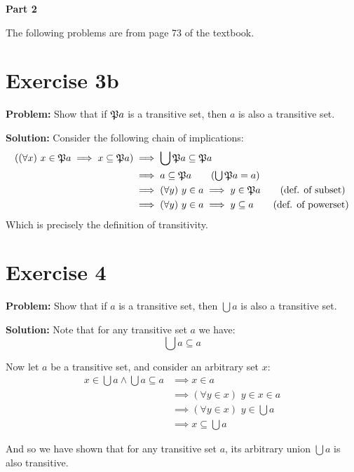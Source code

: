 \documentclass{article}
\begin{document}
\begin{center}
    \Large{\textbf{Part 2}}
\end{center}

The following problems are from page 73 of the textbook.

\section*{Exercise 3b}
\noindent\textbf{Problem:} Show that if $\mathfrak Pa$ is a transitive set, then $a$ is also a transitive set.
\bigskip

\noindent\textbf{Solution:} Consider the following chain of implications:
\begin{align*}
    ((\forall x)\,\,x\in\pset{a}\implies x\subseteq\pset{a)}&\implies\bigcup\pset{a}\subseteq\pset{a}\\
    &\implies a\subseteq\pset{a}\tag{$\bigcup\pset{a}=a$}\\
    &\implies(\forall y)\,\,y\in a\implies y\in\pset{a}\tag{def. of subset}\\
    &\implies(\forall y)\,\,y\in a\implies y\subseteq a\tag{def. of powerset}
\end{align*}
Which is precisely the definition of transitivity.

\section*{Exercise 4}
\noindent\textbf{Problem:} Show that if $a$ is a transitive set, then $\bigcup a$ is also a transitive set.
\bigskip

\noindent\textbf{Solution:} Note that for any transitive set $a$ we have:
\begin{equation*}
    \bigcup a\subseteq a
\end{equation*}

Now let $a$ be a transitive set, and consider an arbitrary set $x$:
\begin{align*}
    x\in\bigcup a\wedge\bigcup a\subseteq a&\implies x\in a\tag{$a$ is transitive}\\
    &\implies(\forall y\in x)\,\,y\in x\in a\\
    &\implies(\forall y\in x)\,\,y\in \bigcup a\tag{def. of arbitrary union}\\
    &\implies x\subseteq \bigcup a\tag{def. of subset}
\end{align*}

And so we have shown that for any transitive set $a$, its arbitrary union $\bigcup a$ is also transitive.
\end{document}
